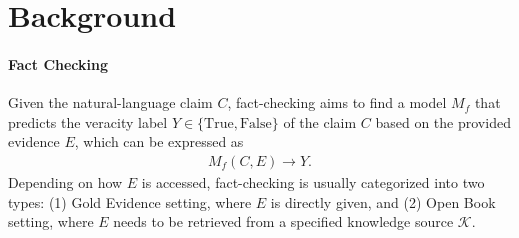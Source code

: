 


\section{Background}
\paragraph{Fact Checking}
Given the natural-language claim $C$, fact-checking aims to find a model $M_f$ that predicts the veracity label $Y \in \{\text{True}, \text{False}\}$ of the claim $C$ based on the provided evidence $E$, which can be expressed as
\begin{align}
    M_f(C, E) \rightarrow Y.
\end{align}
Depending on how $E$ is accessed, fact-checking is usually categorized into two types: (1) Gold Evidence setting, where $E$ is directly given, and (2) Open Book setting, where $E$ needs to be retrieved from a specified knowledge source $\mathcal{K}$.

